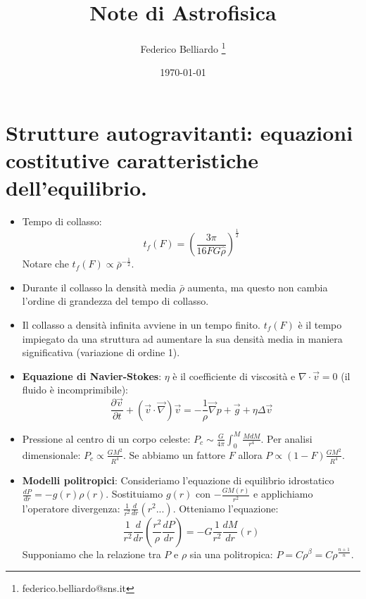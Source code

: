 \documentclass[11pt,a4paper]{article}
\author{Federico Belliardo \thanks{federico.belliardo@sns.it}}
\title{Note di Astrofisica}
\date{\today}
\begin{document}
\maketitle
\tableofcontents
 
\section{Strutture autogravitanti: equazioni costitutive caratteristiche dell’equilibrio.}

\begin{itemize}
\item Tempo di collasso:
\begin{equation}
t_f(F) = \left( \frac{3 \pi}{16 F G \widehat{\rho}} \right) ^{\frac{1}{2}}
\end{equation}
Notare che $t_f(F) \propto \bar{\rho}^{-\frac{1}{2}}$.
\item Durante il collasso la densità media $\bar{\rho}$ aumenta, ma questo non cambia l'ordine di grandezza del tempo di collasso.
\item Il collasso a densità infinita avviene in un tempo finito. $t_f(F)$ è il tempo impiegato da una struttura ad aumentare la sua densità media in maniera significativa (variazione di ordine 1).
\item \textbf{Equazione di Navier-Stokes}: $\eta$ è il coefficiente di viscosità e $\nabla \cdot \vec{v} = 0$ (il fluido è incomprimibile): 
\begin{equation}
\frac{\partial \vec{v}}{\partial t} + \left( \vec{v} \cdot \vec{\nabla} \right) \vec{v} = -\frac{1}{\rho} \vec{\nabla} p + \vec{g} + \eta \Delta \vec{v}
\end{equation}
\item Pressione al centro di un corpo celeste: $P_c \sim \frac{G}{4 \pi} \int_{0}^{M} \frac{M dM}{r^4}$. Per analisi dimensionale: $P_c \propto \frac{G M^2}{R^4}$. Se abbiamo un fattore $F$ allora $P \propto (1 - F) \frac{G M^2}{R^4}$. 
\item \textbf{Modelli politropici}:
Consideriamo l'equazione di equilibrio idrostatico $\frac{d P}{d r} = - g(r) \rho (r)$. Sostituiamo $g(r)$ con $-\frac{G M(r)}{r^2}$ e applichiamo l'operatore divergenza: $\frac{1}{r^2} \frac{d}{d r} \left( r^2 ... \right)$.
Otteniamo l'equazione:
\begin{equation}
\frac{1}{r^2} \frac{d}{dr} \left( \frac{r^2}{\rho} \frac{dP}{dr} \right) = - G \frac{1}{r^2} \frac{dM}{dr} \left( r \right)
\end{equation}
Supponiamo che la relazione tra $P$ e $\rho$ sia una politropica: $P = C \rho^{\beta} = C \rho^{\frac{n+1}{n}}$.

\end{itemize}
\end{document}
